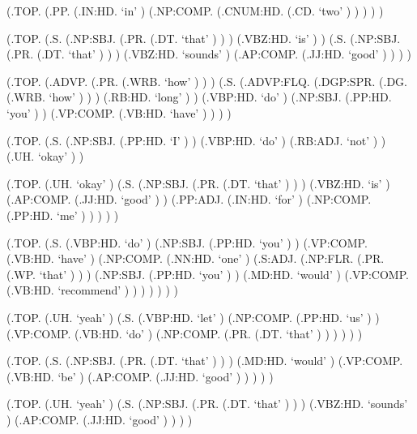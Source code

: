 \documentclass[10pt]{article}
\begin{document}
\begin{parsetree}  (.TOP. (.PP. (.IN:HD. `in' ) (.NP:COMP. (.CNUM:HD. (.CD. `two' ) ) ) ) ) \end{parsetree}

\begin{parsetree}  (.TOP. (.S. (.NP:SBJ. (.PR. (.DT. `that' ) ) ) (.VBZ:HD. `is' ) ) (.S. (.NP:SBJ. (.PR. (.DT. `that' ) ) ) (.VBZ:HD. `sounds' ) (.AP:COMP. (.JJ:HD. `good' ) ) ) ) \end{parsetree}

\begin{parsetree}  (.TOP. (.ADVP. (.PR. (.WRB. `how' ) ) ) (.S. (.ADVP:FLQ. (.DGP:SPR. (.DG. (.WRB. `how' ) ) ) (.RB:HD. `long' ) ) (.VBP:HD. `do' ) (.NP:SBJ. (.PP:HD. `you' ) ) (.VP:COMP. (.VB:HD. `have' ) ) ) ) \end{parsetree}

\begin{parsetree}  (.TOP. (.S. (.NP:SBJ. (.PP:HD. `I' ) ) (.VBP:HD. `do' ) (.RB:ADJ. `not' ) ) (.UH. `okay' ) ) \end{parsetree}

\begin{parsetree}  (.TOP. (.UH. `okay' ) (.S. (.NP:SBJ. (.PR. (.DT. `that' ) ) ) (.VBZ:HD. `is' ) (.AP:COMP. (.JJ:HD. `good' ) ) (.PP:ADJ. (.IN:HD. `for' ) (.NP:COMP. (.PP:HD. `me' ) ) ) ) ) \end{parsetree}

\begin{parsetree}  (.TOP. (.S. (.VBP:HD. `do' ) (.NP:SBJ. (.PP:HD. `you' ) ) (.VP:COMP. (.VB:HD. `have' ) (.NP:COMP. (.NN:HD. `one' ) (.S:ADJ. (.NP:FLR. (.PR. (.WP. `that' ) ) ) (.NP:SBJ. (.PP:HD. `you' ) ) (.MD:HD. `would' ) (.VP:COMP. (.VB:HD. `recommend' ) ) ) ) ) ) ) \end{parsetree}

\begin{parsetree}  (.TOP. (.UH. `yeah' ) (.S. (.VBP:HD. `let' ) (.NP:COMP. (.PP:HD. `us' ) ) (.VP:COMP. (.VB:HD. `do' ) (.NP:COMP. (.PR. (.DT. `that' ) ) ) ) ) ) \end{parsetree}

\begin{parsetree}  (.TOP. (.S. (.NP:SBJ. (.PR. (.DT. `that' ) ) ) (.MD:HD. `would' ) (.VP:COMP. (.VB:HD. `be' ) (.AP:COMP. (.JJ:HD. `good' ) ) ) ) ) \end{parsetree}

\begin{parsetree}  (.TOP. (.UH. `yeah' ) (.S. (.NP:SBJ. (.PR. (.DT. `that' ) ) ) (.VBZ:HD. `sounds' ) (.AP:COMP. (.JJ:HD. `good' ) ) ) ) \end{parsetree}
\end{document}
